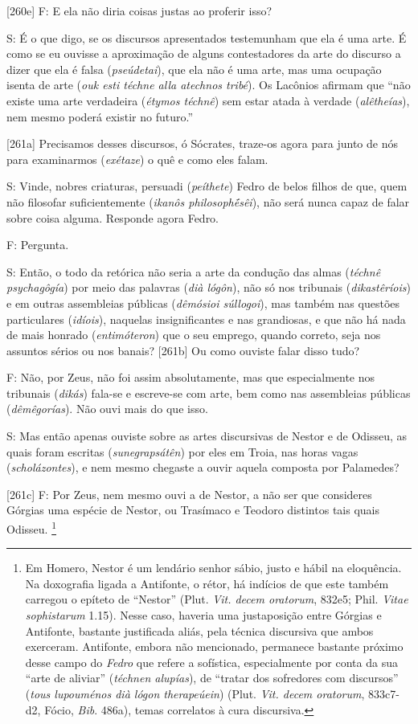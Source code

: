 {[}260e{]} F: E ela não diria coisas justas ao proferir isso?

S: É o que digo, se os discursos apresentados testemunham que ela é uma
arte. É como se eu ouvisse a aproximação de alguns contestadores da arte
do discurso a dizer que ela é falsa (\emph{pseúdetai}), que ela não é
uma arte, mas uma ocupação isenta de arte (\emph{ouk esti téchne alla
atechnos tribé}). Os Lacônios afirmam que ``não existe uma arte
verdadeira (\emph{étymos téchnê}) sem estar atada à verdade
(\emph{alêtheías}), nem mesmo poderá existir no futuro.''

{[}261a{]} Precisamos desses discursos, ó Sócrates, traze-os agora para
junto de nós para examinarmos (\emph{exétaze}) o quê e como eles falam.

S: Vinde, nobres criaturas, persuadi (\emph{peíthete}) Fedro de belos
filhos de que, quem não filosofar suficientemente (\emph{ikanôs
philosophḗsêi}), não será nunca capaz de falar sobre coisa alguma.
Responde agora Fedro.

F: Pergunta.

S: Então, o todo da retórica não seria a arte da condução das almas
(\emph{téchnê} \emph{psychagôgía}) por meio das palavras (\emph{dià
lógôn}), não só nos tribunais (\emph{dikastêríois}) e em outras
assembleias públicas (\emph{dêmósioi súllogoi}), mas também nas questões
particulares (\emph{idíois}), naquelas insignificantes e nas grandiosas,
e que não há nada de mais honrado (\emph{entimóteron}) que o seu
emprego, quando correto, seja nos assuntos sérios ou nos banais?
{[}261b{]} Ou como ouviste falar disso tudo?

F: Não, por Zeus, não foi assim absolutamente, mas que especialmente nos
tribunais (\emph{dikás}) fala-se e escreve-se com arte, bem como nas
assembleias públicas (\emph{dêmêgorías}). Não ouvi mais do que isso.

S: Mas então apenas ouviste sobre as artes discursivas de Nestor e de
Odisseu, as quais foram escritas (\emph{sunegrapsátên}) por eles em
Troia, nas horas vagas (\emph{scholázontes}), e nem mesmo chegaste a
ouvir aquela composta por Palamedes?

{[}261c{]} F: Por Zeus, nem mesmo ouvi a de Nestor, a não ser que
consideres Górgias uma espécie de Nestor, ou Trasímaco e Teodoro
distintos tais quais Odisseu. \footnote{Em Homero, Nestor é um lendário
  senhor sábio, justo e hábil na eloquência. Na doxografia ligada a
  Antifonte, o rétor, há indícios de que este também carregou o epíteto
  de ``Nestor'' (Plut. \emph{Vit. decem oratorum}, 832e5; Phil.
  \emph{Vitae sophistarum} 1.15). Nesse caso, haveria uma justaposição
  entre Górgias e Antifonte, bastante justificada aliás, pela técnica
  discursiva que ambos exerceram. Antifonte, embora não mencionado,
  permanece bastante próximo desse campo do \emph{Fedro} que refere a
  sofística, especialmente por conta da sua ``arte de aliviar''
  (\emph{téchnen alupías}), de ``tratar dos sofredores com discursos''
  (\emph{tous lupouménos dià lógon therapeúein}) (Plut. \emph{Vit. decem
  oratorum}, 833c7-d2, Fócio, \emph{Bib}. 486a), temas correlatos à cura
  discursiva.}

